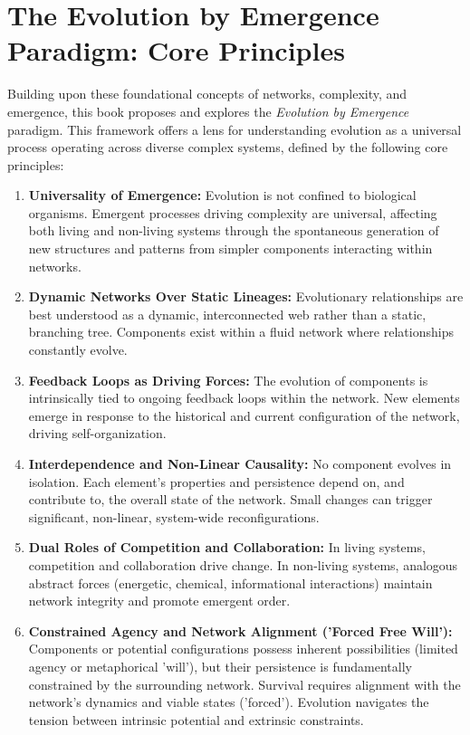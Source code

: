 \documentclass[12pt,openany]{book}
\begin{document}
\section*{The Evolution by Emergence Paradigm: Core Principles}

Building upon these foundational concepts of networks, complexity, and emergence, this book proposes and explores the \emph{Evolution by Emergence} paradigm. This framework offers a lens for understanding evolution as a universal process operating across diverse complex systems, defined by the following core principles:

\begin{enumerate}
    \item \textbf{Universality of Emergence:} Evolution is not confined to biological organisms. Emergent processes driving complexity are universal, affecting both living and non-living systems through the spontaneous generation of new structures and patterns from simpler components interacting within networks.

    \item \textbf{Dynamic Networks Over Static Lineages:} Evolutionary relationships are best understood as a dynamic, interconnected web rather than a static, branching tree. Components exist within a fluid network where relationships constantly evolve.

    \item \textbf{Feedback Loops as Driving Forces:} The evolution of components is intrinsically tied to ongoing feedback loops within the network. New elements emerge in response to the historical and current configuration of the network, driving self-organization.

    \item \textbf{Interdependence and Non-Linear Causality:} No component evolves in isolation. Each element’s properties and persistence depend on, and contribute to, the overall state of the network. Small changes can trigger significant, non-linear, system-wide reconfigurations.

    \item \textbf{Dual Roles of Competition and Collaboration:} In living systems, competition and collaboration drive change. In non-living systems, analogous abstract forces (energetic, chemical, informational interactions) maintain network integrity and promote emergent order.

    \item \textbf{Constrained Agency and Network Alignment ('Forced Free Will'):} Components or potential configurations possess inherent possibilities (limited agency or metaphorical 'will'), but their persistence is fundamentally constrained by the surrounding network. Survival requires alignment with the network's dynamics and viable states ('forced'). Evolution navigates the tension between intrinsic potential and extrinsic constraints.


\end{enumerate}
\end{document}
